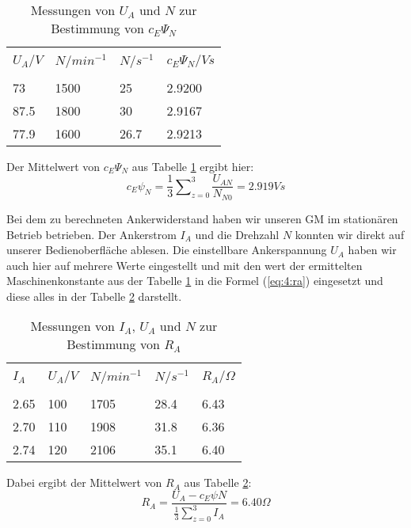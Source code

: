 \begin{table}[h]
	\centering
	\begin{tabular}{p{1.5cm} p{1.5cm} p{1.5cm} | p{1.5cm}}
		&&&\\[-1em]
		$ U_{A}/V $ & $ N/min^{-1} $ & $ N/s^{-1} $ &  $ c_{E}\Psi_{N}/Vs $\\
		\hline &&&\\[-1em]
		73 & 1500 & 25 & 2.9200 \\
		87.5 & 1800 & 30 & 2.9167 \\
		77.9 & 1600 & 26.7 & 2.9213
	\end{tabular}
	\caption{Messungen von $ U_{A} $ und $ N $ zur Bestimmung von $ c_{E}\Psi_{N} $}
	\label{tab:4b:cepsi}
\end{table}
Der Mittelwert von $ c_{E}\Psi_{N} $ aus Tabelle \ref{tab:4b:cepsi} ergibt hier:
\begin{equation}
	c_{E}\psi_{N} = \frac{1}{3} \sum\nolimits_{z=0}^3 \frac{U_{AN}}{N_{N0}} = 2.919Vs
\end{equation}

Bei dem zu berechneten Ankerwiderstand haben wir unseren GM im stationären Betrieb betrieben. Der Ankerstrom $ I_{A} $ und die Drehzahl $ N $ konnten wir direkt auf unserer Bedienoberfläche ablesen. Die einstellbare Ankerspannung $ U_{A} $ haben wir auch hier auf mehrere Werte eingestellt und mit den wert der ermittelten Maschinenkonstante aus der Tabelle \ref{tab:4b:cepsi} in die Formel (\ref{eq:4:ra}) eingesetzt und diese alles in der Tabelle \ref{tab:4b:ra} darstellt.
\begin{table}[h]
	\centering
	\begin{tabular}{p{1.5cm} p{1.5cm} p{1.5cm} p{1.5cm} | p{1.5cm}}
		&&&&\\[-1em]
		$ I_{A} $ & $ U_{A}/V $ & $ N/min^{-1} $ & $ N/s^{-1} $ &  $ R_{A}/\Omega $\\
		\hline &&&&\\[-1em]
		2.65 & 100 & 1705 & 28.4 & 6.43 \\
		2.70 & 110 & 1908 & 31.8 & 6.36 \\
		2.74 & 120 & 2106 & 35.1 & 6.40
	\end{tabular}
	\caption{Messungen von $ I_{A} $, $ U_{A} $ und $ N $ zur Bestimmung von $ R_{A} $}
	\label{tab:4b:ra}
\end{table}
Dabei ergibt der Mittelwert von $ R_{A} $ aus Tabelle \ref{tab:4b:ra}:
\begin{equation}
	R_{A} = \frac{U_{A} - c_{E}\psi N}{\frac{1}{3} \sum\nolimits_{z=0}^3 I_{A}} = 6.40\Omega
\end{equation}

